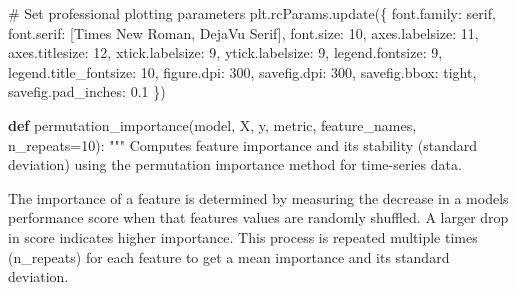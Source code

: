 \documentclass[
  letterpaper,
  DIV=11,
  numbers=noendperiod]{scrreprt}
\newenvironment{Shaded}{\begin{snugshade}}{\end{snugshade}}
\newcommand{\CommentTok}[1]{\textcolor[rgb]{0.37,0.37,0.37}{#1}}
\newcommand{\DecValTok}[1]{\textcolor[rgb]{0.68,0.00,0.00}{#1}}
\newcommand{\FloatTok}[1]{\textcolor[rgb]{0.68,0.00,0.00}{#1}}
\newcommand{\KeywordTok}[1]{\textcolor[rgb]{0.00,0.23,0.31}{\textbf{#1}}}
\newcommand{\NormalTok}[1]{\textcolor[rgb]{0.00,0.23,0.31}{#1}}
\newcommand{\OperatorTok}[1]{\textcolor[rgb]{0.37,0.37,0.37}{#1}}
\newcommand{\StringTok}[1]{\textcolor[rgb]{0.13,0.47,0.30}{#1}}
\begin{document}
\begin{Shaded}
\begin{Highlighting}[]
\CommentTok{\# Set professional plotting parameters}
\NormalTok{plt.rcParams.update(\{}
    \StringTok{\textquotesingle{}font.family\textquotesingle{}}\NormalTok{: }\StringTok{\textquotesingle{}serif\textquotesingle{}}\NormalTok{,}
    \StringTok{\textquotesingle{}font.serif\textquotesingle{}}\NormalTok{: [}\StringTok{\textquotesingle{}Times New Roman\textquotesingle{}}\NormalTok{, }\StringTok{\textquotesingle{}DejaVu Serif\textquotesingle{}}\NormalTok{],}
    \StringTok{\textquotesingle{}font.size\textquotesingle{}}\NormalTok{: }\DecValTok{10}\NormalTok{,}
    \StringTok{\textquotesingle{}axes.labelsize\textquotesingle{}}\NormalTok{: }\DecValTok{11}\NormalTok{,}
    \StringTok{\textquotesingle{}axes.titlesize\textquotesingle{}}\NormalTok{: }\DecValTok{12}\NormalTok{,}
    \StringTok{\textquotesingle{}xtick.labelsize\textquotesingle{}}\NormalTok{: }\DecValTok{9}\NormalTok{,}
    \StringTok{\textquotesingle{}ytick.labelsize\textquotesingle{}}\NormalTok{: }\DecValTok{9}\NormalTok{,}
    \StringTok{\textquotesingle{}legend.fontsize\textquotesingle{}}\NormalTok{: }\DecValTok{9}\NormalTok{,}
    \StringTok{\textquotesingle{}legend.title\_fontsize\textquotesingle{}}\NormalTok{: }\DecValTok{10}\NormalTok{,}
    \StringTok{\textquotesingle{}figure.dpi\textquotesingle{}}\NormalTok{: }\DecValTok{300}\NormalTok{,}
    \StringTok{\textquotesingle{}savefig.dpi\textquotesingle{}}\NormalTok{: }\DecValTok{300}\NormalTok{,}
    \StringTok{\textquotesingle{}savefig.bbox\textquotesingle{}}\NormalTok{: }\StringTok{\textquotesingle{}tight\textquotesingle{}}\NormalTok{,}
    \StringTok{\textquotesingle{}savefig.pad\_inches\textquotesingle{}}\NormalTok{: }\FloatTok{0.1}
\NormalTok{\})}

\KeywordTok{def}\NormalTok{ permutation\_importance(model, X, y, metric, feature\_names, n\_repeats}\OperatorTok{=}\DecValTok{10}\NormalTok{):}
    \CommentTok{"""}
\CommentTok{    Computes feature importance and its stability (standard deviation)}
\CommentTok{    using the permutation importance method for time{-}series data.}

\CommentTok{    The importance of a feature is determined by measuring the decrease in a model\textquotesingle{}s}
\CommentTok{    performance score when that feature\textquotesingle{}s values are randomly shuffled. A larger drop}
\CommentTok{    in score indicates higher importance. This process is repeated multiple times}
\CommentTok{    (n\_repeats) for each feature to get a mean importance and its standard deviation.}


\end{Highlighting}
\end{Shaded}
\end{document}
